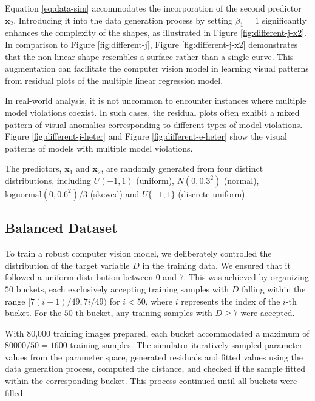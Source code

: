 \documentclass[]{interact}
\theoremstyle{plain}%
\theoremstyle{definition}
\theoremstyle{remark}
\begin{document}
Equation \ref{eq:data-sim} accommodates the incorporation of the second
predictor \(\boldsymbol{x}_2\). Introducing it into the data generation
process by setting \(\beta_1 = 1\) significantly enhances the complexity
of the shapes, as illustrated in Figure \ref{fig:different-j-x2}. In
comparison to Figure \ref{fig:different-j}, Figure
\ref{fig:different-j-x2} demonstrates that the non-linear shape
resembles a surface rather than a single curve. This augmentation can
facilitate the computer vision model in learning visual patterns from
residual plots of the multiple linear regression model.

In real-world analysis, it is not uncommon to encounter instances where
multiple model violations coexist. In such cases, the residual plots
often exhibit a mixed pattern of visual anomalies corresponding to
different types of model violations. Figure \ref{fig:different-j-heter}
and Figure \ref{fig:different-e-heter} show the visual patterns of
models with multiple model violations.

The predictors, \(\boldsymbol{x}_1\) and \(\boldsymbol{x}_2\), are
randomly generated from four distinct distributions, including
\(U(-1, 1)\) (uniform), \(N(0, 0.3^2)\) (normal),
\(\text{lognormal}(0, 0.6^2)/3\) (skewed) and \(U\{-1, 1\}\) (discrete
uniform).

\subsection{Balanced Dataset}\label{balanced-dataset}

To train a robust computer vision model, we deliberately controlled the
distribution of the target variable \(D\) in the training data. We
ensured that it followed a uniform distribution between \(0\) and \(7\).
This was achieved by organizing \(50\) buckets, each exclusively
accepting training samples with \(D\) falling within the range
\([7(i - 1)/49, 7i/49)\) for \(i < 50\), where \(i\) represents the
index of the \(i\)-th bucket. For the \(50\)-th bucket, any training
samples with \(D \geq 7\) were accepted.

With 80,000 training images prepared, each bucket accommodated a maximum
of \(80000/ 50 = 1600\) training samples. The simulator iteratively
sampled parameter values from the parameter space, generated residuals
and fitted values using the data generation process, computed the
distance, and checked if the sample fitted within the corresponding
bucket. This process continued until all buckets were filled.
\end{document}
